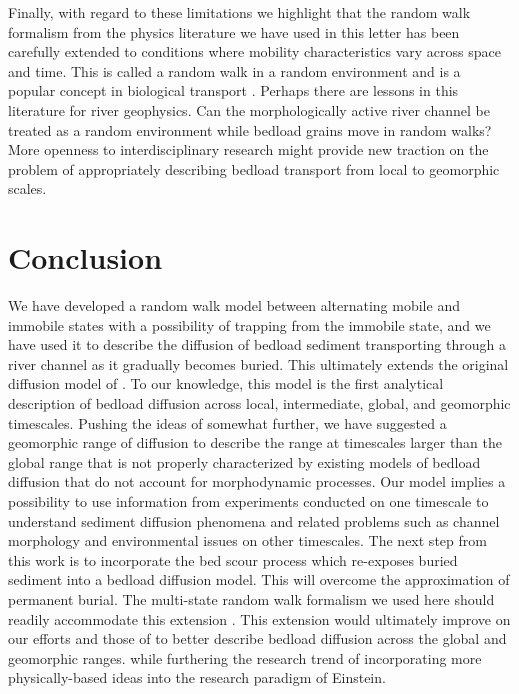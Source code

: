 \documentclass[]{agujournal2018}
\begin{document}
Finally, with regard to these limitations we highlight that the random walk formalism from the physics literature we have used in this letter \citep{Weiss1994} has been carefully extended to conditions where mobility characteristics vary across space and time. This is called a random walk in a random environment and is a popular concept in biological transport \citep[e.g.][]{Codling2008}. Perhaps there are lessons in this literature for river geophysics. Can the morphologically active river channel be treated as a random environment while bedload grains move in random walks?
More openness to interdisciplinary research might provide new traction on the problem of appropriately describing bedload transport from local to geomorphic scales.

\section{Conclusion}
We have developed a random walk model between alternating mobile and immobile states with a possibility of trapping from the immobile state, and we have used it to describe the diffusion of bedload sediment transporting through a river channel as it gradually becomes buried.
This ultimately extends the original diffusion model of \citet{Einstein1937}.
To our knowledge, this model is the first analytical description of bedload diffusion across local, intermediate, global, and geomorphic timescales.
Pushing the ideas of \citet{Nikora2002} somewhat further, we have suggested a geomorphic range of diffusion to describe the range at timescales larger than the global range that is not properly characterized by existing models of bedload diffusion that do not account for morphodynamic processes.
Our model implies a possibility to use information from experiments conducted on one timescale to understand sediment diffusion phenomena and related problems such as channel morphology \citep[e.g.][]{Church2006, Hassan2017} and environmental issues \citep[e.g.][]{Macklin2006,Gaeuman2017} on other timescales.
The next step from this work is to incorporate the bed scour process which re-exposes buried sediment into a bedload diffusion model.
This will overcome the approximation of permanent burial. 
The multi-state random walk formalism we used here should readily accommodate this extension \citep[e.g.][]{Weiss1994}.
This extension would ultimately improve on our efforts and those of \citet{Wu2019} to better describe bedload diffusion across the global and geomorphic ranges.
 while furthering the research trend of incorporating more physically-based ideas into the research paradigm of Einstein.
\end{document}
